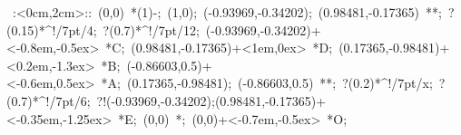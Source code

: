 %


\hbox{
\xy    <2cm,0cm>:<0cm,2cm>::
       (0,0) *\ellipse(1){-}; (1,0); 
       (-0.93969,-0.34202); (0.98481,-0.17365) **\dir{-}; 
       ?(0.15)*^!/7pt/{4};  ?(0.7)*^!/7pt/{12};  
       (-0.93969,-0.34202)+<-0.8em,-0.5ex> *{C}; 
       (0.98481,-0.17365)+<1em,0ex> *{D}; 
       (0.17365,-0.98481)+<0.2em,-1.3ex> *{B}; 
       (-0.86603,0.5)+<-0.6em,0.5ex> *{A}; 
       (0.17365,-0.98481); (-0.86603,0.5) **\dir{-};
       ?(0.2)*^!/7pt/{x};  ?(0.7)*^!/7pt/{6};  
  ?!{(-0.93969,-0.34202);(0.98481,-0.17365)}+<-0.35em,-1.25ex> 
                  *{E};
       (0,0) *{\bullet}; (0,0)+<-0.7em,-0.5ex> *{O};
\endxy}



